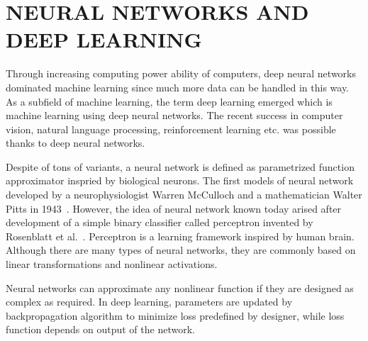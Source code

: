 \chapter{NEURAL NETWORKS AND DEEP LEARNING}
\label{chap:dnns}

Through increasing computing power ability of computers, 
deep neural networks dominated machine learning since much more data can be handled in this way. 
As a subfield of machine learning, the term deep learning emerged which is machine learning using deep neural networks. 
The recent success in computer vision, natural language processing, 
reinforcement learning etc. was possible thanks to deep neural networks. 

Despite of tons of variants, a neural network is defined as parametrized function approximator inspried by biological neurons. 
The first models of neural network developed by a neurophysiologist Warren McCulloch and a mathematician Walter Pitts in 1943~\cite{mcculloch_logical_1943}. 
However, the idea of neural network known today arised after development of a simple binary classifier called perceptron invented by Rosenblatt et al.~\cite{rosenblatt_perceptron_1958}. 
Perceptron is a learning framework inspired by human brain. Although there are many types of neural networks, 
they are commonly based on linear transformations and nonlinear activations.

Neural networks can approximate any nonlinear function if they are designed as complex as required. 
In deep learning, parameters are updated by backpropagation algorithm to minimize loss  predefined by designer, while loss function depends on output of the network.
